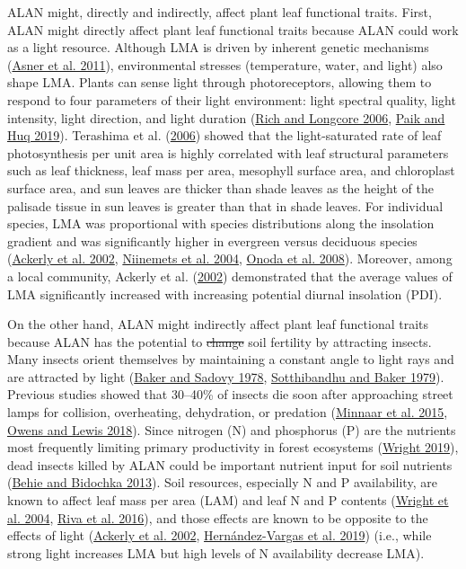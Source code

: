 \documentclass[
  12pt,
  letterpaper,
  DIV=11,
  numbers=noendperiod]{scrartcl}
\providecommand{\DIFaddtex}[1]{{\protect\color{blue}\uwave{#1}}} %
\providecommand{\DIFdeltex}[1]{{\protect\color{red}\sout{#1}}}                      %
\providecommand{\DIFaddbegin}{} %
\providecommand{\DIFaddend}{} %
\providecommand{\DIFdelbegin}{} %
\providecommand{\DIFdelend}{} %
\providecommand{\DIFadd}[1]{\texorpdfstring{\DIFaddtex{#1}}{#1}} %
\providecommand{\DIFdel}[1]{\texorpdfstring{\DIFdeltex{#1}}{}} %
\newcommand{\DIFscaledelfig}{0.5}
\newlength{\DIFdelgraphicswidth} %
\newlength{\DIFdelgraphicsheight} %
\newcommand{\DIFaddincludegraphics}[2][]{{\color{blue}\fbox{\DIFOincludegraphics[#1]{#2}}}} %
\newcommand{\DIFdelincludegraphics}[2][]{%
\sbox{\DIFdelgraphicsbox}{\DIFOincludegraphics[#1]{#2}}%
\settoboxwidth{\DIFdelgraphicswidth}{\DIFdelgraphicsbox} %
\settoboxtotalheight{\DIFdelgraphicsheight}{\DIFdelgraphicsbox} %
\scalebox{\DIFscaledelfig}{%
\parbox[b]{\DIFdelgraphicswidth}{\usebox{\DIFdelgraphicsbox}\\[-\baselineskip] \rule{\DIFdelgraphicswidth}{0em}}\llap{\resizebox{\DIFdelgraphicswidth}{\DIFdelgraphicsheight}{%
\setlength{\unitlength}{\DIFdelgraphicswidth}%
\begin{picture}(1,1)%
\thicklines\linethickness{2pt} %
{\color[rgb]{1,0,0}\put(0,0){\framebox(1,1){}}}%
{\color[rgb]{1,0,0}\put(0,0){\line( 1,1){1}}}%
{\color[rgb]{1,0,0}\put(0,1){\line(1,-1){1}}}%
\end{picture}%
}\hspace*{3pt}}} %
} %
\DeclareRobustCommand{\DIFaddbegin}{\DIFOaddbegin \let\includegraphics\DIFaddincludegraphics} %
\DeclareRobustCommand{\DIFaddend}{\DIFOaddend \let\includegraphics\DIFOincludegraphics} %
\DeclareRobustCommand{\DIFdelbegin}{\DIFOdelbegin \let\includegraphics\DIFdelincludegraphics} %
\DeclareRobustCommand{\DIFdelend}{\DIFOaddend \let\includegraphics\DIFOincludegraphics} %
\begin{document}
ALAN might, directly and indirectly, affect plant leaf functional
traits. First, ALAN might directly affect plant leaf functional traits
because ALAN could work as a light resource. Although LMA is driven by
inherent genetic mechanisms (\protect\hyperlink{ref-Asner2011}{Asner et
al. 2011}), environmental stresses (temperature, water, and light) also
shape LMA. Plants can sense light through photoreceptors, allowing them
to respond to four parameters of their light environment: light spectral
quality, light intensity, light direction, and light duration
(\protect\hyperlink{ref-Rich2006}{Rich and Longcore 2006},
\protect\hyperlink{ref-Paik2019}{Paik and Huq 2019}). Terashima et al.
(\protect\hyperlink{ref-Terashima2006}{2006}) showed that the
light-saturated rate of leaf photosynthesis per unit area is highly
correlated with leaf structural parameters such as leaf thickness, leaf
mass per area, mesophyll surface area, and chloroplast surface area, and
sun leaves are thicker than shade leaves as the height of the palisade
tissue in sun leaves is greater than that in shade leaves. For
individual species, LMA was proportional with species distributions
along the insolation gradient and was significantly higher in evergreen
versus deciduous species (\protect\hyperlink{ref-Ackerly2002}{Ackerly et
al. 2002}, \protect\hyperlink{ref-Niinemets2004}{Niinemets et al. 2004},
\protect\hyperlink{ref-Onoda2008}{Onoda et al. 2008}). Moreover, among a
local community, Ackerly et al.
(\protect\hyperlink{ref-Ackerly2002}{2002}) demonstrated that the
average values of LMA significantly increased with increasing potential
diurnal insolation (PDI).

On the other hand, ALAN might indirectly affect plant leaf functional
traits because ALAN has the potential to \DIFdelbegin \DIFdel{change }\DIFdelend \DIFaddbegin \DIFadd{increase }\DIFaddend soil fertility by
attracting insects. Many insects orient themselves by maintaining a
constant angle to light rays and are attracted by light
(\protect\hyperlink{ref-Baker1978}{Baker and Sadovy 1978},
\protect\hyperlink{ref-Sotthibandhu1979}{Sotthibandhu and Baker 1979}).
Previous studies showed that 30--40\% of insects die soon after
approaching street lamps for collision, overheating, dehydration, or
predation (\protect\hyperlink{ref-Minnaar2015}{Minnaar et al. 2015},
\protect\hyperlink{ref-Owens2018}{Owens and Lewis 2018}). Since nitrogen
(N) and phosphorus (P) are the nutrients most frequently limiting
primary productivity in forest ecosystems
(\protect\hyperlink{ref-Wright2019}{Wright 2019}), dead insects killed
by ALAN could be important nutrient input for soil nutrients
(\protect\hyperlink{ref-Behie2013}{Behie and Bidochka 2013}). Soil
resources, especially N and P availability, are known to affect leaf
mass per area (LAM) and leaf N and P contents
(\protect\hyperlink{ref-Wright2004}{Wright et al. 2004},
\protect\hyperlink{ref-Riva2016}{Riva et al. 2016}), and those effects
are known to be opposite to the effects of light
(\protect\hyperlink{ref-Ackerly2002}{Ackerly et al. 2002},
\protect\hyperlink{ref-Hernandez-Vargas2019}{Hernández-Vargas et al.
2019}) (i.e., while strong light increases LMA but high levels of N
availability decrease LMA).
\end{document}
